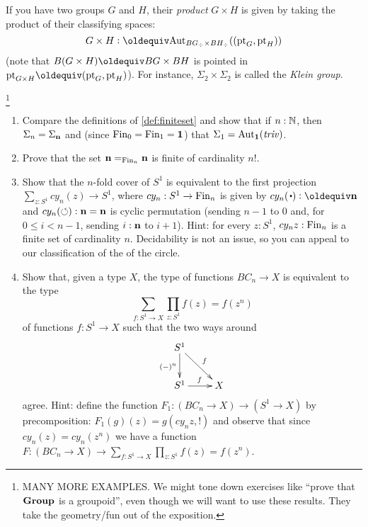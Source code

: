 \begin{example}\label{ex:productofgroups}
  If you have two groups $G$ and $H$, their {\em product} $G\times H$ is given by taking the product of their classifying spaces:
$$G\times H\defequi\aut_{BG_\div\times BH_\div}((\pt_G,\pt_H))$$
(note that $B(G\times H)\oldequiv BG\times BH$ is pointed in $\pt_{G\times H}\oldequiv(\pt_G,\pt_H)$).  
For instance, $\Sigma_2\times\Sigma_2$ is called the {\em Klein group}.
\end{example}

\footnote{MANY MORE EXAMPLES.  We might tone down exercises like ``prove that $\mathbf{Group}$ is a groupoid'', even though we will want to use these results.  They take the geometry/fun out of the exposition.}
\begin{xca}
  \begin{enumerate}
  \item Compare the definitions of \cref{def:finiteset} and show that if $n:\mathbb{N}$, then $\Sigma_n=\Sigma_{\mathbf{n} }$ %
and (since $\operatorname{Fin}_0=\operatorname{Fin}_1=\mathbf{1}$) that $\Sigma_{1}=\mathrm{Aut}_{\mathbf{1} }(\mathop{\mathit{triv}})$.
\item Prove that the set $\mathbf{n} =_{\operatorname{Fin}_n}\mathbf{n} $ is finite of cardinality $n!$.
\item Show that the $n$-fold cover of $S^1$ is equivalent to the first projection $\sum_{z:S^1}cy_n(z)\to S^1$, where $cy_n:S^1\to\operatorname{Fin}_n$ is given by $cy_n(\base)\defequi\bn n$ and $cy_n(\circlearrowleft):\mathbf{n}=\mathbf{n}$ is cyclic permutation (sending $n-1$ to $0$ and, for $0\leq i<n-1$, sending $i:\mathbf{n}$ to $i+1$).  Hint: for every $z:S^1$, $cy_nz:\operatorname{Fin}_n$ is a finite set of cardinality $n$.  Decidability is not an issue, so you can appeal to our classification of the \coverings of the circle.
\item Show that, given a type $X$, the type of functions $BC_n\to X$ is equivalent to the type 
$$\sum_{f:S^1\to X}\prod_{z:S^1}f(z)=f(z^n)$$ of functions $f:S^1\to X$ such that the two ways around
$$\xymatrix{S^1\ar[d]_{(-)^n}\ar[dr]^f&\\S^1\ar[r]^f&X}$$
agree.  Hint: define the function $F_1:(BC_n\to X)\to (S^1\to X)$ by precomposition: $F_1(g)(z)=g(cy_nz,!)$ and observe that since $cy_n(z)=cy_n(z^n)$ we have a function $F:(BC_n\to X)\to \sum_{f:S^1\to X}\prod_{z:S^1}f(z)=f(z^n)$.
  \end{enumerate} 
\end{xca}

